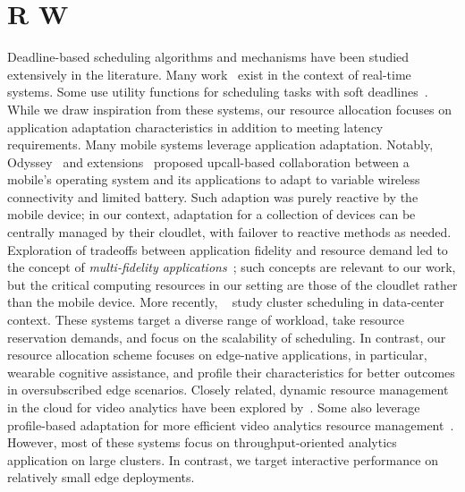 \section{R W}
\label{sec: resource-management-related}

Deadline-based scheduling algorithms and mechanisms have been studied
extensively in the literature. Many work~\cite{tokuda1990real, kao1993deadline,
    stankovic2012deadline, steiger2004operating} exist in the context of real-time
systems. Some use utility functions for scheduling tasks with soft
deadlines~\cite{ravindran2005recent, li2004utility}. While we draw
inspiration from these systems, our resource allocation focuses on application
adaptation characteristics in addition to meeting latency requirements.
Many mobile systems leverage application adaptation. Notably,
Odyssey~\cite{Noble1997} and extensions~\cite{Flinn1999} proposed upcall-based
collaboration between a mobile's operating system and its applications to adapt
to variable wireless connectivity and limited battery. Such adaption was purely
reactive by the mobile device; in our context, adaptation for a collection of
devices can be centrally managed by their cloudlet, with failover to reactive
methods as needed. Exploration of tradeoffs between application fidelity and
resource demand led to the concept of {\em multi-fidelity
        applications}~\cite{Satya1999}; such concepts are relevant to our work, but the
critical computing resources in our setting are those of the cloudlet rather
than the mobile device. More recently,
~\cite{boutin2014apollo,yao2014haste,verma2015large,ousterhout2013sparroW,delimitrou2014quasar,schwarzkopf2013omega}
study cluster scheduling in data-center context. These systems target a diverse
range of workload, take resource reservation demands, and focus on the
scalability of scheduling. In contrast, our resource allocation scheme focuses
on edge-native applications, in particular, wearable cognitive assistance, and
profile their characteristics for better outcomes in oversubscribed edge
scenarios. Closely related, dynamic resource management in the cloud for video
analytics have been explored by~\cite{sembiring2013dynamic, fu2015drs,
    kaseb2015cloud}. Some also leverage profile-based adaptation for more efficient
video analytics resource management~\cite{zhang2017live, hung2018videoedge,
    jiang2018chameleon}. However, most of these systems focus on throughput-oriented
analytics application on large clusters. In contrast, we target interactive
performance on relatively small edge deployments.



